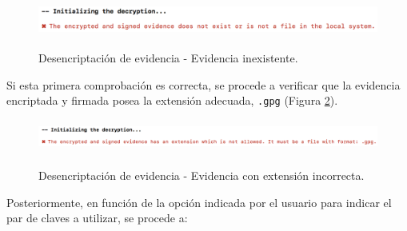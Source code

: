 \documentclass[12pt,a4paper, twoside]{report}
\begin{document}
		\begin{figure}[!ht]   
			\caption{Desencriptación de evidencia - Evidencia inexistente.} 
			\begin{center} 					\includegraphics[width=15cm,height=1.1cm]{Images/userGuide/evidence/evidence_nonexist} \\
				\label{fig:userguide_evidence_nonexist} 
			\end{center}  
		\end{figure}

	Si esta primera comprobación es correcta, se procede a verificar que la evidencia encriptada y firmada posea la extensión adecuada, \texttt{.gpg} (Figura \ref{fig:userguide_evidence_invalidFormat}). 

		\begin{figure}[!ht]   
			\caption{Desencriptación de evidencia - Evidencia con extensión incorrecta.} 
			\begin{center} 					\includegraphics[width=16cm,height=1.1cm]{Images/userGuide/evidence/evidence_invalidFormat} \\
				\label{fig:userguide_evidence_invalidFormat} 
			\end{center}  
		\end{figure}
	
	Posteriormente, en función de la opción indicada por el usuario para indicar el par de claves a utilizar, se procede a:
\end{document}
